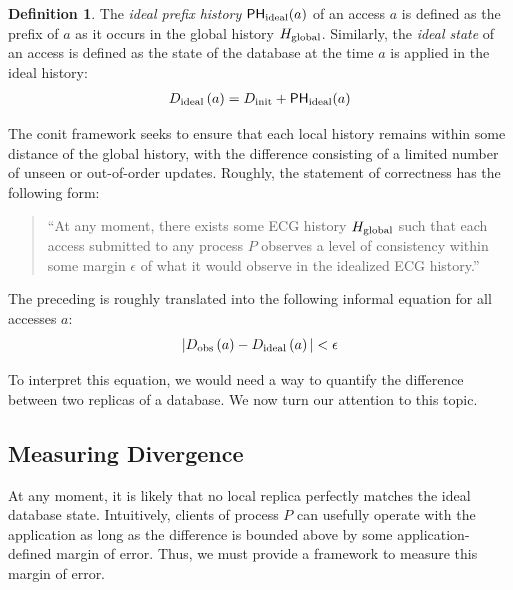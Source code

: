 \documentclass[]             %
{NASA}                       %
\theoremstyle{definition}
\newtheorem{definition}[theorem]{Definition}
\begin{document}
\begin{definition}
  The \emph{ideal prefix history} $\mathsf{PH}_{\mathrm{ideal}}{\left(a\right)}$ of an
  access $a$ is defined as the prefix of $a$ as it occurs in the
  global history $H_\mathrm{global}$. Similarly, the \emph{ideal state} of an
  access is defined as the state of the database at the time $a$ is
  applied in the ideal history:
\begin{gather}
  D_{\textrm{ideal}}\left(a\right) = D_\textrm{init} + \mathsf{PH}_{\mathrm{ideal}}{\left(a\right)} \label{eq:conit-D-ideal-at}
\end{gather}
\end{definition}

The conit framework seeks to ensure that each local history remains
within some distance of the global history, with the difference
consisting of a limited number of unseen or out-of-order
updates. Roughly, the statement of correctness has the following form:

\begin{quote}
  ``At any moment, there exists some ECG history $H_\mathrm{global}$ such that
  each access submitted to any process $P$ observes a level of
  consistency within some margin $\epsilon$ of what it would observe
  in the idealized ECG history.''
\end{quote}
\noindent The preceding is roughly translated into the following informal
equation for all accesses $a$:
\begin{equation}
  | D_{\textrm{obs}}\left(a\right) - D_{\textrm{ideal}}\left(a\right) | < \epsilon
\end{equation}

To interpret this equation, we would need a way to quantify the
difference between two replicas of a database. We now turn our
attention to this topic.

\subsection{Measuring Divergence}
\label{sssec:conit-divergence}
At any moment, it is likely that no local replica perfectly matches
the ideal database state. Intuitively, clients of process $P$ can
usefully operate with the application as long as the difference is
bounded above by some application-defined margin of error. Thus, we
must provide a framework to measure this margin of error.
\end{document}
